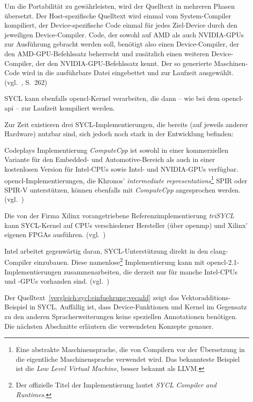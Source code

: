 Um die Portabilität zu gewährleisten, wird der Quelltext in mehreren Phasen
übersetzt. Der Host-spezifische Quelltext wird einmal vom System-Compiler
kompiliert, der Device-spezifische Code einmal für jedes Ziel-Device durch den
jeweiligen Device-Compiler. Code, der sowohl auf AMD als auch NVIDIA-GPUs
zur Ausführung gebracht werden soll, benötigt also einen Device-Compiler,
der den AMD-GPU-Befehlssatz beherrscht und zusätzlich einen weiteren
Device-Compiler, der den NVIDIA-GPU-Befehlssatz kennt. Der so generierte
Maschinen-Code wird in die ausführbare Datei eingebettet und zur Laufzeit
ausgewählt. (vgl.~\cite{syclspec}, S.\ 262)

SYCL kann ebenfalls \gls{opencl}-Kernel verarbeiten, die dann -- wie bei dem
\gls{opencl}-\gls{api} -- zur Laufzeit kompiliert werden.

Zur Zeit existieren drei SYCL-Implementierungen, die bereits (auf jeweils
anderer Hardware) nutzbar sind, sich jedoch noch stark in der Entwicklung
befinden:

Codeplays Implementierung \textit{ComputeCpp} ist sowohl in einer kommerziellen
Variante für den Embedded- und Automotive-Bereich als auch in einer kostenlosen
Version für Intel-CPUs sowie Intel- und NVIDIA-GPUs verfügbar.
\gls{opencl}-Implementierungen, die Khronos'
\textit{intermediate representations}\footnote{Eine abstrakte Maschinensprache,
die von Compilern vor der Übersetzung in die eigentliche Maschinensprache
verwendet wird. Das bekannteste Beispiel ist die
\textit{Low Level Virtual Machine}, besser bekannt als LLVM.} SPIR oder SPIR-V
unterstützen, können ebenfalls mit \textit{ComputeCpp} angesprochen werden.
(vgl.~\cite{computecpp})

Die von der Firma Xilinx vorangetriebene Referenzimplementierung
\textit{triSYCL} kann SYCL-Kernel auf CPUs verschiedener Hersteller (über
\gls{openmp}) und Xilinx' eigenen FPGAs ausführen.
(vgl.~\cite{trisycl})

Intel arbeitet gegenwärtig daran, SYCL-Unterstützung direkt in den
clang-Compiler einzubauen. Diese namenlose\footnote{Der offizielle Titel der
Implementierung lautet \textit{SYCL Compiler and Runtimes}.} Implementierung
kann mit \gls{opencl}-2.1-Implementierungen zusammenarbeiten, die derzeit nur
für manche Intel-CPUs und -GPUs vorhanden sind.
(vgl.~\cite{intelsycl})

Der Quelltext~\ref{vergleich:sycl:einfuehrung:vecadd} zeigt das
Vektoradditions-Beispiel in SYCL. Auffällig ist, dass Device-Funktionen und
Kernel im Gegensatz zu den anderen Spracherweiterungen keine speziellen
Annotationen benötigen. Die nächsten Abschnitte erläutern die verwendeten
Konzepte genauer.

